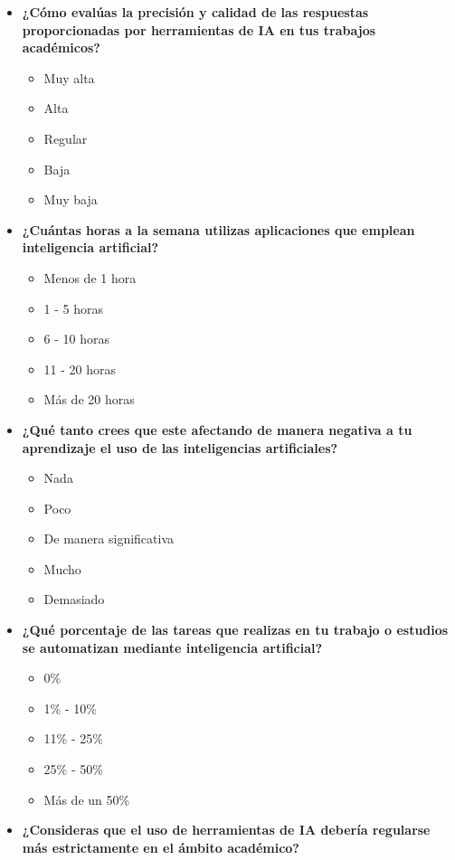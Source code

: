 \documentclass{article}
\newenvironment{recoleccionDeInformacion}{}{}
\begin{document}
\begin{recoleccionDeInformacion}
\begin{multicols}{2}
\begin{itemize}
\begin{itemize}
      \end{itemize}
      \item \textbf{¿Cómo evalúas la precisión y calidad de las respuestas proporcionadas por herramientas de IA en tus trabajos académicos?}
      \begin{itemize}
        \item Muy alta
        \item Alta
        \item Regular
        \item Baja
        \item Muy baja
      \end{itemize}
      \item \textbf{¿Cuántas horas a la semana utilizas aplicaciones que emplean inteligencia artificial?}
      \begin{itemize}
        \item Menos de 1 hora
        \item 1 - 5 horas
        \item 6 - 10 horas
        \item 11 - 20 horas
        \item Más de 20 horas
      \end{itemize}
      \item \textbf{¿Qué tanto crees que este afectando de manera negativa a tu aprendizaje el uso de las inteligencias artificiales?}
      \begin{itemize}
        \item Nada
        \item Poco
        \item De manera significativa
        \item Mucho
        \item Demasiado
      \end{itemize}
      \item \textbf{¿Qué porcentaje de las tareas que realizas en tu trabajo  o estudios se automatizan mediante inteligencia artificial?}
      \begin{itemize}
        \item 0\%
        \item 1\% - 10\%
        \item 11\% - 25\%
        \item 25\% - 50\%
        \item Más de un 50\%
      \end{itemize}
      \item \textbf{¿Consideras que el uso de herramientas de IA debería regularse más estrictamente en el ámbito académico?}

\end{itemize}
\end{multicols}
\end{recoleccionDeInformacion}
\end{document}
